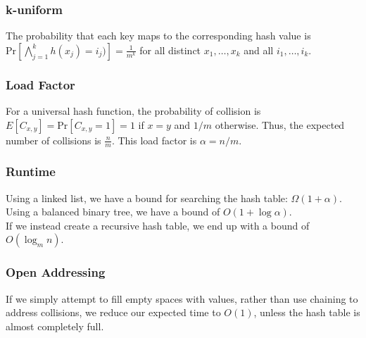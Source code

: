 \subsubsection{k-uniform}
The probability that each key maps to the corresponding hash value is $\text{Pr}[\bigwedge_{j=1}^{k} h(x_j) = i_j)] = \frac{1}{m^{k}}$ for all distinct $x_1,\ldots,x_k$ and all $i_1,\ldots,i_k$.

\subsubsection{Load Factor}
For a universal hash function, the probability of collision is $E[C_{x, y}] = \text{Pr}[C_{x,y} = 1] = 1$ if $x = y$ and $1/m$ otherwise. Thus, the expected number of collisions is $\frac{n}{m}$. This load factor is $\alpha = n/m$.\\

\subsubsection{Runtime}
Using a linked list, we have a bound for searching the hash table: $\Omega(1 + \alpha)$. Using a balanced binary tree, we have a bound of $O(1 + \log \alpha)$.\\

If we instead create a recursive hash table, we end up with a bound of $O(\log_m n)$.

\subsubsection{Open Addressing}
If we simply attempt to fill empty spaces with values, rather than use chaining to address collisions, we reduce our expected time to $O(1)$, unless the hash table is almost completely full.